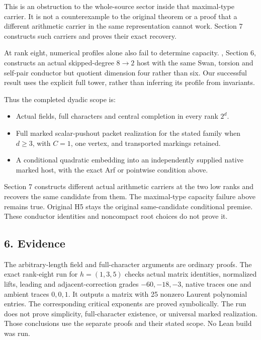 This is an obstruction to the whole-source sector inside that
maximal-type carrier. It is not a counterexample to the original theorem
or a proof that a different arithmetic carrier in the same
representation cannot work. Section 7 constructs such carriers and
proves their exact recovery.

At rank eight, numerical profiles alone also fail to determine capacity.
, Section 6, constructs an
actual skipped-degree \(8\to2\) host with the same Swan, torsion and
self-pair conductor but quotient dimension four rather than six. Our
successful result uses the explicit full tower, rather than inferring
its profile from invariants.

Thus the completed dyadic scope is:

\begin{itemize}
\tightlist
\item
  Actual fields, full characters and central completion in every rank
  \(2^d\).
\item
  Full marked scalar-pushout packet realization for the stated family
  when \(d\ge3\), with \(C=1\), one vertex, and transported markings
  retained.
\item
  A conditional quadratic embedding into an independently supplied
  native marked host, with the exact Arf or pointwise condition above.
\end{itemize}

Section 7 constructs different actual arithmetic carriers at the two low
ranks and recovers the same candidate from them. The maximal-type
capacity failure above remains true. Original H5 stays the original same-candidate conditional premise. These conductor identities and
noncompact root choices do not prove it.

\hypertarget{dyadic_synthesis-evidence}{%
\subsection{6. Evidence}\label{dyadic_synthesis-evidence}}

The arbitrary-length field and full-character arguments are ordinary
proofs. The exact rank-eight run for \(h=(1,3,5)\) checks actual matrix
identities, normalized lifts, leading and adjacent-correction grades
\(-60,-18,-3\), native traces one and ambient traces \(0,0,1\). It
outputs a matrix with 25 nonzero Laurent polynomial entries. The
corresponding critical exponents are proved symbolically. The run does
not prove simplicity, full-character existence, or universal marked
realization. Those conclusions use the separate proofs and their stated
scope. No Lean build was run.

